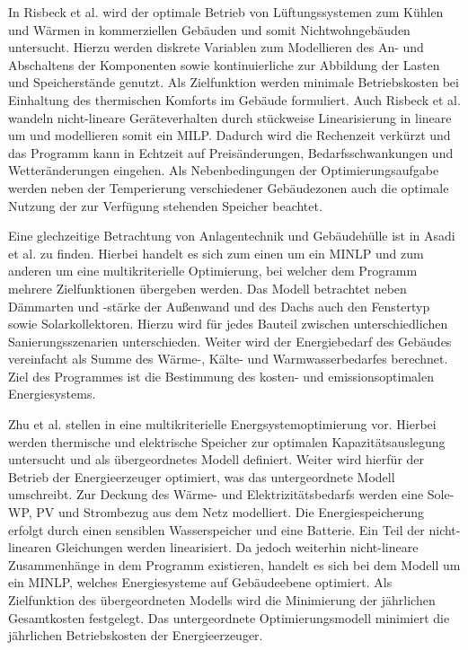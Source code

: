 In Risbeck et al. \cite{Risbeck.2017} wird der optimale Betrieb von Lüftungssystemen zum Kühlen und Wärmen in kommerziellen Gebäuden und somit Nichtwohngebäuden untersucht.
Hierzu werden diskrete Variablen zum Modellieren des An- und Abschaltens der Komponenten sowie kontinuierliche zur Abbildung der Lasten und Speicherstände genutzt.
Als Zielfunktion werden minimale Betriebskosten bei Einhaltung des thermischen Komforts im Gebäude formuliert.
Auch Risbeck et al. wandeln nicht-lineare Geräteverhalten durch stückweise Linearisierung in lineare um und modellieren somit ein MILP.
Dadurch wird die Rechenzeit verkürzt und das Programm kann in Echtzeit auf Preisänderungen, Bedarfsschwankungen und Wetteränderungen eingehen.
Als Nebenbedingungen der Optimierungsaufgabe werden neben der Temperierung verschiedener Gebäudezonen auch die optimale Nutzung der zur Verfügung stehenden Speicher beachtet.

Eine glechzeitige Betrachtung von Anlagentechnik und Gebäudehülle ist in Asadi et al. \cite{Asadi.2012} zu finden.
Hierbei handelt es sich zum einen um ein MINLP und zum anderen um eine multikriterielle Optimierung, bei welcher dem Programm mehrere Zielfunktionen übergeben werden.
Das Modell betrachtet neben Dämmarten und -stärke der Außenwand und des Dachs auch den Fenstertyp sowie Solarkollektoren. 
Hierzu wird für jedes Bauteil zwischen unterschiedlichen Sanierungsszenarien unterschieden.
Weiter wird der Energiebedarf des Gebäudes vereinfacht als Summe des Wärme-, Kälte- und Warmwasserbedarfes berechnet.
Ziel des Programmes ist die Bestimmung des kosten- und emissionsoptimalen Energiesystems.

Zhu et al. stellen in \cite{Zhu.2019} eine multikriterielle Energsystemoptimierung vor.
Hierbei werden thermische und elektrische Speicher zur optimalen Kapazitätsauslegung untersucht und als übergeordnetes Modell definiert.
Weiter wird hierfür der Betrieb der Energieerzeuger optimiert, was das untergeordnete Modell umschreibt.
Zur Deckung des Wärme- und Elektrizitätsbedarfs werden eine Sole-WP, PV und Strombezug aus dem Netz modelliert.
Die Energiespeicherung erfolgt durch einen sensiblen Wasserspeicher und eine Batterie.
Ein Teil der nicht-linearen Gleichungen werden linearisiert. 
Da jedoch weiterhin nicht-lineare Zusammenhänge in dem Programm existieren, handelt es sich bei dem Modell um ein MINLP, welches Energiesysteme auf Gebäudeebene optimiert.
Als Zielfunktion des übergeordneten Modells wird die Minimierung der jährlichen Gesamtkosten festgelegt.
Das untergeordnete Optimierungsmodell minimiert die jährlichen Betriebskosten der Energieerzeuger.

